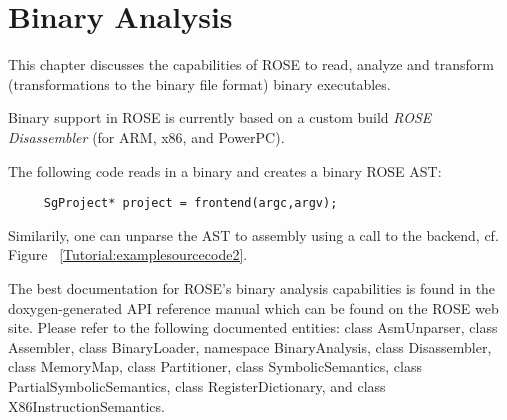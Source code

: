 \chapter{Binary Analysis}

This chapter discusses the capabilities of ROSE to read, analyze and transform 
(transformations to the binary file format) binary executables.

Binary support in ROSE is currently based on a custom build \emph{ROSE Disassembler} (for ARM, x86, and PowerPC).

The following code reads in a binary and creates a binary ROSE AST:

{\mySmallFontSize
\begin{verbatim}
     SgProject* project = frontend(argc,argv);
\end{verbatim}
}

Similarily, one can unparse the AST to assembly using a call to the backend, cf. Figure ~\ref{Tutorial:examplesourcecode2}.

The best documentation for ROSE's binary analysis capabilities is
found in the doxygen-generated API reference manual which can be found
on the ROSE web site. Please refer to the following documented
entities: class AsmUnparser, class Assembler, class BinaryLoader,
namespace BinaryAnalysis, class Disassembler, class MemoryMap, class
Partitioner, class SymbolicSemantics, class PartialSymbolicSemantics,
class RegisterDictionary, and class X86InstructionSemantics.






